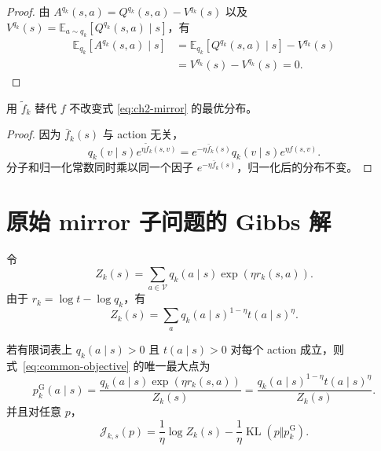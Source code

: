 \documentclass[lang=cn,scheme=chinese,openany]{../book/elegantbook}
\newcommand{\KL}{\operatorname{KL}}
\begin{document}
\begin{proof}
由 $A^{ q_k}(s,a)=Q^{ q_k}(s,a)-V^{ q_k}(s)$ 以及
$V^{ q_k}(s)=\mathbb E_{a\sim q_k}[Q^{ q_k}(s,a)\mid s]$，有
\begin{align*}
\mathbb E_{ q_k}[A^{ q_k}(s,a)\mid s]
&=\mathbb E_{ q_k}[Q^{ q_k}(s,a)\mid s]-V^{ q_k}(s)\\
&=V^{ q_k}(s)-V^{ q_k}(s)=0.
\end{align*}
\end{proof}

\begin{proposition}
\label{prop:ch2-centering}
用 $\widetilde f_k$ 替代 $f$ 不改变式 \eqref{eq:ch2-mirror} 的最优分布。
\end{proposition}

\begin{proof}
因为 $\bar f_k(s)$ 与 action 无关，
\begin{equation*}
 q_k(v\mid s)e^{\eta\widetilde f_k(s,v)}
=e^{-\eta\bar f_k(s)} q_k(v\mid s)e^{\eta f(s,v)}.
\end{equation*}
分子和归一化常数同时乘以同一个因子 $e^{-\eta\bar f_k(s)}$，归一化后的分布不变。
\end{proof}



\section{原始 mirror 子问题的 Gibbs 解}

令
\begin{equation*}
 Z_k(s)=\sum_{a\in\mathcal V} q_k(a\mid s)\exp(\eta r_k(s,a)).
\end{equation*}
由于 $r_k=\log t-\log q_k$，有
\begin{equation}\label{eq:token-partition}
 Z_k(s)=\sum_a q_k(a\mid s)^{1-\eta} t(a\mid s)^\eta.
\end{equation}

\begin{theorem}
\label{thm:token-target}
若有限词表上 $ q_k(a\mid s)>0$ 且 $ t(a\mid s)>0$ 对每个 action 成立，则式~\eqref{eq:common-objective} 的唯一最大点为
\begin{equation}\label{eq:token-target}
  p_k^{\mathrm G}(a\mid s)=
 \frac{ q_k(a\mid s)\exp(\eta r_k(s,a))}{Z_k(s)}
 =\frac{ q_k(a\mid s)^{1-\eta} t(a\mid s)^\eta}{Z_k(s)}.
\end{equation}
并且对任意 $p$，
\begin{equation}\label{eq:variational-identity}
 \mathcal J_{k,s}(p)
 =\frac{1}{\eta}\log Z_k(s)
 -\frac{1}{\eta}\KL(p\Vert  p_k^{\mathrm G}).
\end{equation}
\end{theorem}
\end{document}
